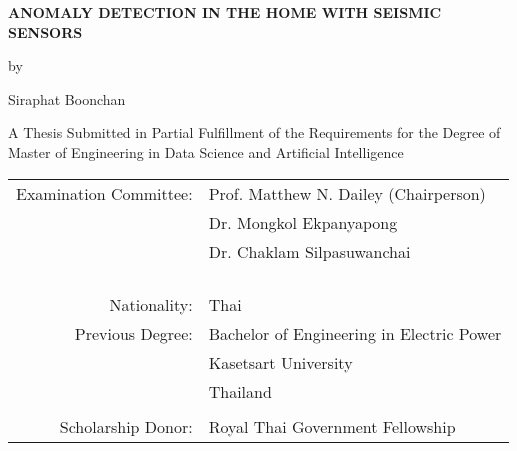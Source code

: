 \begin{titlepage}
  \begin{center}
    \setlength{\baselineskip}{1.6em}

    \textbf{\large{
        ANOMALY DETECTION IN THE HOME  WITH SEISMIC SENSORS
      }}

    \vspace{3em} %

    by

    \vspace{3em} %

    Siraphat Boonchan

    \vspace{4em} %

    A Thesis Submitted in Partial Fulfillment of the Requirements for the Degree of Master of Engineering in Data Science and Artificial Intelligence

    \vspace{4em} %

    \begin{center}
      \begin{tabular}{ rl }
        Examination Committee: & Prof. Matthew N. Dailey (Chairperson)             \\
                               & Dr. Mongkol Ekpanyapong                           \\
                               & Dr. Chaklam Silpasuwanchai                        \\\\

        \\ \\ \\
        Nationality:           & Thai                                              \\
        Previous Degree:       & Bachelor of Engineering in Electric Power \\
                               & Kasetsart University                              \\
                               & Thailand                                          \\
        \\
        Scholarship Donor:     & Royal Thai Government Fellowship
      \end{tabular}
    \end{center}


\end{center}
\end{titlepage}
